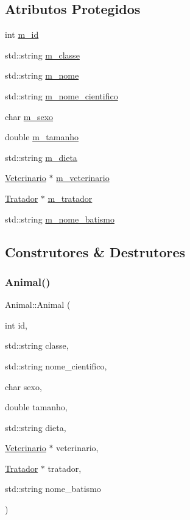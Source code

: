 \subsection*{Atributos Protegidos}
\begin{DoxyCompactItemize}
\item 
int \hyperlink{classAnimal_a1a39448480e098fc74b5b67c4921a5ec}{m\+\_\+id}
\item 
std\+::string \hyperlink{classAnimal_a8a4d049b481ab0fe88015cde7557d281}{m\+\_\+classe}
\item 
std\+::string \hyperlink{classAnimal_adea60068908c590e8f92b2680023f8ce}{m\+\_\+nome}
\item 
std\+::string \hyperlink{classAnimal_af90a04b32166b6815617cfd4033da1e4}{m\+\_\+nome\+\_\+cientifico}
\item 
char \hyperlink{classAnimal_aaa6d77e661ed0fa9a33500588c8acfef}{m\+\_\+sexo}
\item 
double \hyperlink{classAnimal_afe83ba40e79b42d06b0c95f61aaa0218}{m\+\_\+tamanho}
\item 
std\+::string \hyperlink{classAnimal_af7ea074464d9a468f7412a2165afd553}{m\+\_\+dieta}
\item 
\hyperlink{classVeterinario}{Veterinario} $\ast$ \hyperlink{classAnimal_a3b95df9484483642a10cafcafc15961d}{m\+\_\+veterinario}
\item 
\hyperlink{classTratador}{Tratador} $\ast$ \hyperlink{classAnimal_a1d9b76d126f6d72374f94d4d359e0ea7}{m\+\_\+tratador}
\item 
std\+::string \hyperlink{classAnimal_aa9717b7e2de07af7118050ca1c10d0b5}{m\+\_\+nome\+\_\+batismo}
\end{DoxyCompactItemize}


\subsection{Construtores \& Destrutores}
\mbox{\label{classAnimal_ab045099aad905de0d8c7fbbab296cad6}} 
\subsubsection{\texorpdfstring{Animal()}{Animal()}}
{\footnotesize\ttfamily Animal\+::\+Animal (\begin{DoxyParamCaption}\item[{int}]{id,  }\item[{std\+::string}]{classe,  }\item[{std\+::string}]{nome\+\_\+cientifico,  }\item[{char}]{sexo,  }\item[{double}]{tamanho,  }\item[{std\+::string}]{dieta,  }\item[{\hyperlink{classVeterinario}{Veterinario} $\ast$}]{veterinario,  }\item[{\hyperlink{classTratador}{Tratador} $\ast$}]{tratador,  }\item[{std\+::string}]{nome\+\_\+batismo }\end{DoxyParamCaption})}



